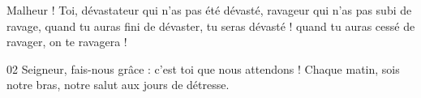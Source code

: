 Malheur ! Toi, dévastateur qui n’as pas été dévasté, ravageur qui n’as pas subi de ravage, quand tu auras fini de dévaster, tu seras dévasté ! quand tu auras cessé de ravager, on te ravagera !

02 Seigneur, fais-nous grâce : c’est toi que nous attendons ! Chaque matin, sois notre bras, notre salut aux jours de détresse.
